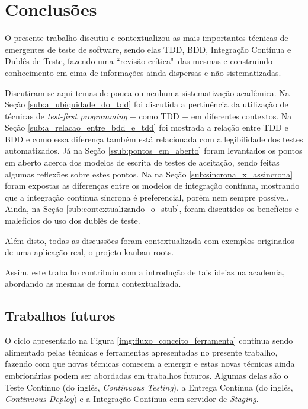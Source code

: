 \chapter{Conclusões}
\label{cha:conclusoes}

O presente trabalho discutiu e contextualizou as mais importantes técnicas de emergentes de teste de software, sendo elas TDD, BDD, Integração Contínua e Dublês de Teste, fazendo uma ``revisão crítica"\ das mesmas e construindo conhecimento em cima de informações ainda dispersas e não sistematizadas.

Discutiram-se aqui temas de pouca ou nenhuma sistematização acadêmica. Na Seção \ref{sub:a_ubiquidade_do_tdd} foi discutida a pertinência da utilização de técnicas de \textit{test-first programming} $-$ como TDD $-$ em diferentes contextos. Na Seção \ref{sub:a_relacao_entre_bdd_e_tdd} foi mostrada a relação entre TDD e BDD e como essa diferença também está relacionada com a legibilidade dos testes automatizados. Já na Seção \ref{ssub:pontos_em_aberto} foram levantados os pontos em aberto acerca dos modelos de escrita de testes de aceitação, sendo feitas algumas reflexões sobre estes pontos. Na na Seção \ref{sub:sincrona_x_assincrona} foram expostas as diferenças entre os modelos de integração contínua, mostrando que a integração contínua síncrona é preferencial, porém nem sempre possível. Ainda, na Seção \ref{sub:contextualizando_o_stub}, foram discutidos os benefícios e malefícios do uso dos dublês de teste.

Além disto, todas as discussões foram contextualizada com exemplos originados de uma aplicação real, o projeto kanban-roots.

Assim, este trabalho contribuiu com a introdução de tais ideias na academia, abordando as mesmas de forma contextualizada.

\section{Trabalhos futuros}
\label{sec:trabalhos_futuros}

O ciclo apresentado na Figura \ref{img:fluxo_conceito_ferramenta} continua sendo alimentado pelas técnicas e ferramentas apresentadas no presente trabalho, fazendo com que novas técnicas comecem a emergir e estas novas técnicas ainda embrionárias podem ser abordadas em trabalhos futuros. Algumas delas são o Teste Contínuo (do inglês, \textit{Continuous Testing}), a Entrega Contínua (do inglês, \textit{Continuous Deploy}) e a Integração Contínua com servidor de \textit{Staging}.